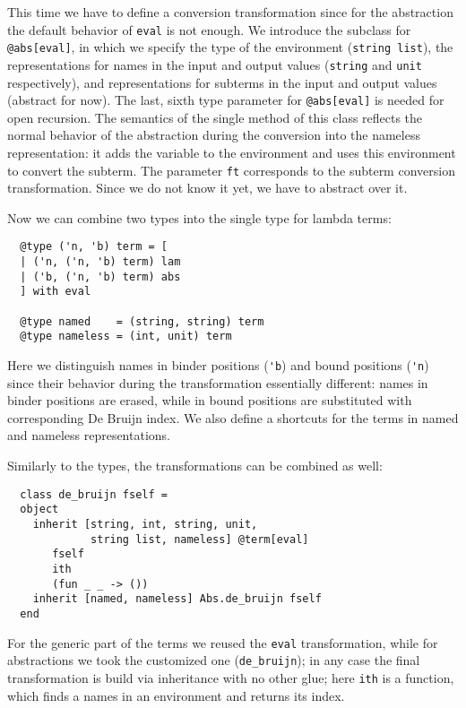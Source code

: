 \documentclass[twocolumn,8pt]{extarticle}
\newcommand{\cd}[1]{\texttt{#1}}
\begin{document}
This time we have to define a conversion transformation since for the abstraction the default behavior of \cd{eval} is not
enough. We introduce the subclass for \cd{@abs[eval]}, in which we specify the type of the environment (\lstinline{string list}),
the representations for names in the input and output values (\lstinline{string} and \lstinline{unit} respectively), and
representations for subterms in the input and output values (abstract for now). The last, sixth type parameter for \cd{@abs[eval]}
is needed for open recursion. The semantics of the single method of this class reflects the normal behavior of the
abstraction during the conversion into the nameless representation: it adds the variable to the environment and uses this
environment to convert the subterm. The parameter \lstinline{ft} corresponds to the subterm conversion transformation. Since
we do not know it yet, we have to abstract over it.

Now we can combine two types into the single type for lambda terms:

\begin{lstlisting}
  @type ('n, 'b) term = [
  | ('n, ('n, 'b) term) lam
  | ('b, ('n, 'b) term) abs
  ] with eval

  @type named    = (string, string) term
  @type nameless = (int, unit) term
\end{lstlisting}

Here we distinguish names in binder positions (\lstinline{'b}) and bound positions (\lstinline{'n}) since their behavior during the
transformation essentially different: names in binder positions are erased, while in bound positions are substituted with corresponding
De Bruijn index. We also define a shortcuts for the terms in named and nameless representations.

Similarly to the types, the transformations can be combined as well:

\begin{lstlisting}
  class de_bruijn fself =
  object
    inherit [string, int, string, unit,
             string list, nameless] @term[eval]
       fself
       ith
       (fun _ _ -> ())
    inherit [named, nameless] Abs.de_bruijn fself
  end
\end{lstlisting}

For the generic part of the terms we reused the \cd{eval} transformation, while for abstractions we took the customized one (\lstinline{de_bruijn}); in
any case the final transformation is build via inheritance with no other glue; here \lstinline{ith} is a function, which finds a names in an
environment and returns its index.
\end{document}
